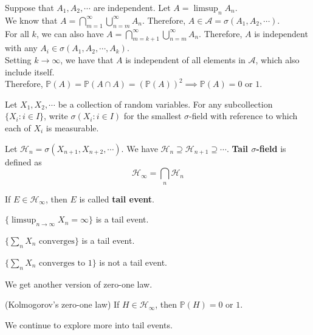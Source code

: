 \documentclass{huhtakm-template-book}
\newcommand{\prob}{\mathbb{P}}
\begin{document}
    \begin{proofing}
        Suppose that $A_{1},A_{2},\cdots$ are independent. Let $A=\limsup_{n}A_{n}$.\\
        We know that $A=\bigcap_{m=1}^{\infty}\bigcup_{n=m}^{\infty}A_{n}$. Therefore, $A\in\mathcal{A}=\sigma(A_{1},A_{2},\cdots)$.\\
        For all $k$, we can also have $A=\bigcap_{m=k+1}^{\infty}\bigcup_{n=m}^{\infty}A_{n}$. Therefore, $A$ is independent with any $A_{i}\in\sigma(A_{1},A_{2},\cdots,A_{k})$.\\
        Setting $k\to\infty$, we have that $A$ is independent of all elements in $\mathcal{A}$, which also include itself.\\
        Therefore, $\prob(A)=\prob(A\cap A)=(\prob(A))^{2}\implies\prob(A)=0$ or $1$.
    \end{proofing}
    \newpage
    Let $X_{1},X_{2},\cdots$ be a collection of random variables. For any subcollection $\{X_{i}:i\in I\}$, write $\sigma(X_{i}:i\in I)$ for the smallest $\sigma$-field with reference to which each of $X_{i}$ is measurable.
    \begin{defn}
        Let $\mathcal{H}_{n}=\sigma(X_{n+1},X_{n+2},\cdots)$. We have $\mathcal{H}_{n}\supseteq\mathcal{H}_{n+1}\supseteq\cdots$. \textbf{Tail $\sigma$-field} is defined as
        \begin{equation*}
            \mathcal{H}_{\infty}=\bigcap_{n}\mathcal{H}_{n}
        \end{equation*}
    \end{defn}
    \begin{rem}
        If $E\in\mathcal{H}_{\infty}$, then $E$ is called \textbf{tail event}.
    \end{rem}
    \begin{eg}
        $\{\limsup_{n\to\infty}X_{n}=\infty\}$ is a tail event.
    \end{eg}
    \begin{eg}
        $\{\sum_{n}X_{n}\text{ converges}\}$ is a tail event.
    \end{eg}
    \begin{eg}
        $\{\sum_{n}X_{n}\text{ converges to }1\}$ is not a tail event.
    \end{eg}
    We get another version of zero-one law.
    \begin{thm}(Kolmogorov's zero-one law)
        If $H\in\mathcal{H}_{\infty}$, then $\prob(H)=0$ or $1$.
    \end{thm}
    We continue to explore more into tail events.
\end{document}
